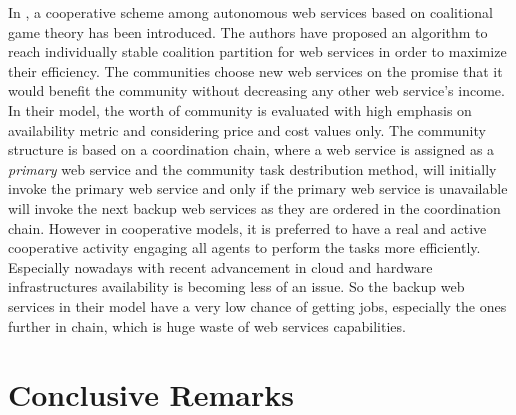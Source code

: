         In \cite{10.1109/TSC.2012.12}, a cooperative scheme among autonomous
        web services based on coalitional game theory has been introduced. The authors have proposed an algorithm to
        reach individually stable coalition partition for web services in order to
        maximize their efficiency. The communities choose new web services on the promise
        that it would benefit the community without decreasing any other web service's
        income. In their model, the worth of community is evaluated with high emphasis on
        availability metric and considering price and cost values only. The community structure is based on a coordination chain,
        where a web service is assigned as a \emph{primary} web service and the community task destribution
        method, will initially invoke the primary web service and only if the primary web service is unavailable
        will invoke the next backup web services as they are ordered in the coordination chain. However in cooperative models, it is preferred to
        have a real and active cooperative activity engaging all agents to perform the tasks more efficiently. Especially nowadays
        with recent advancement in cloud and hardware infrastructures availability is becoming less of an issue. So the backup web services
        in their model have a very low chance of getting jobs, especially the ones further in chain, which is huge waste of web services
        capabilities.

\section{Conclusive Remarks}


